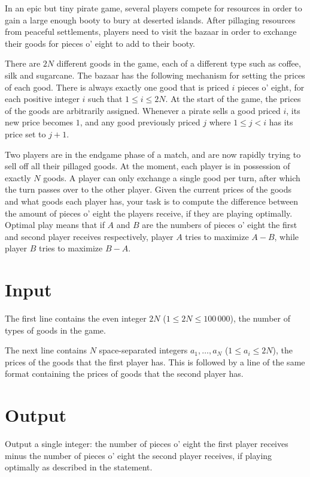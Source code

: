 In an epic but tiny pirate game, several players compete for resources in order to gain a large enough booty to bury at deserted islands.
After pillaging resources from peaceful settlements, players need to visit the bazaar in order to exchange their goods for pieces o' eight to add to their booty.

There are $2N$ different goods in the game, each of a different type such as coffee, silk and sugarcane.
The bazaar has the following mechanism for setting the prices of each good.
There is always exactly one good that is priced $i$ pieces o' eight, for each positive integer $i$ such that $1 \le i \le 2N$.
At the start of the game, the prices of the goods are arbitrarily assigned.
Whenever a pirate sells a good priced $i$, its new price becomes $1$, and any good previously priced $j$ where $1 \le j < i$ has its price set to $j + 1$.

Two players are in the endgame phase of a match, and are now rapidly trying to sell off all their pillaged goods.
At the moment, each player is in possession of exactly $N$ goods.
A player can only exchange a single good per turn, after which the turn passes over to the other player.
Given the current prices of the goods and what goods each player has, your task is to compute the difference between the amount of pieces o' eight the players receive, if they are playing optimally.
Optimal play means that if $A$ and $B$ are the numbers of pieces o' eight the first and second player receives respectively, player $A$ tries to maximize $A - B$, while player $B$ tries to maximize $B - A$.

\section*{Input}
The first line contains the even integer $2N$ ($1 \le 2N \le 100\,000$), the number of types of goods in the game.

The next line contains $N$ space-separated integers $a_1, \dots, a_N$ ($1 \le a_i \le 2N$), the prices of the goods that the first player has.
This is followed by a line of the same format containing the prices of goods that the second player has.

\section*{Output}
Output a single integer: the number of pieces o' eight the first player receives minus the number of pieces o' eight the second player receives, if playing optimally as described in the statement.

